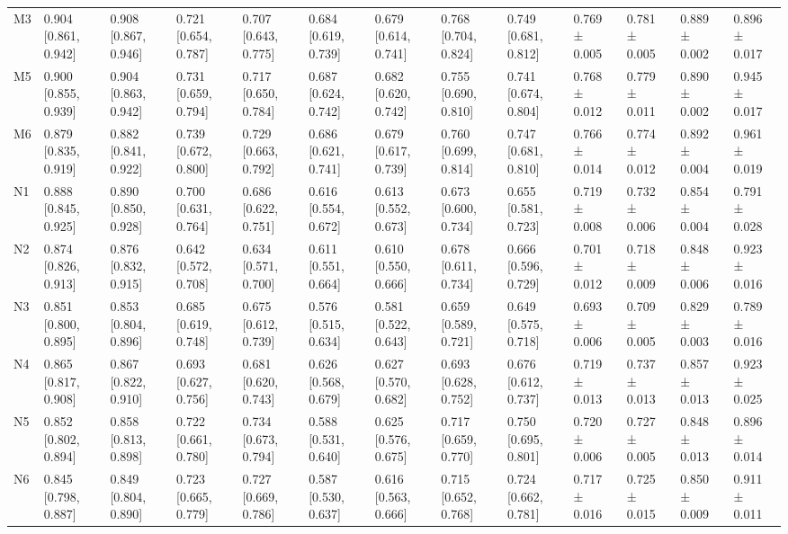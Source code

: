 \begin{table}
\begin{tabular}{lllllllllllll}
M3 & 0.904 [0.861, 0.942] & 0.908 [0.867, 0.946] & 0.721 [0.654, 0.787] & 0.707 [0.643, 0.775] & 0.684 [0.619, 0.739] & 0.679 [0.614, 0.741] & 0.768 [0.704, 0.824] & 0.749 [0.681, 0.812] & 0.769 ± 0.005 & 0.781 ± 0.005 & 0.889 ± 0.002 & 0.896 ± 0.017 \\
M5 & 0.900 [0.855, 0.939] & 0.904 [0.863, 0.942] & 0.731 [0.659, 0.794] & 0.717 [0.650, 0.784] & 0.687 [0.624, 0.742] & 0.682 [0.620, 0.742] & 0.755 [0.690, 0.810] & 0.741 [0.674, 0.804] & 0.768 ± 0.012 & 0.779 ± 0.011 & 0.890 ± 0.002 & 0.945 ± 0.017 \\
M6 & 0.879 [0.835, 0.919] & 0.882 [0.841, 0.922] & 0.739 [0.672, 0.800] & 0.729 [0.663, 0.792] & 0.686 [0.621, 0.741] & 0.679 [0.617, 0.739] & 0.760 [0.699, 0.814] & 0.747 [0.681, 0.810] & 0.766 ± 0.014 & 0.774 ± 0.012 & 0.892 ± 0.004 & 0.961 ± 0.019 \\
N1 & 0.888 [0.845, 0.925] & 0.890 [0.850, 0.928] & 0.700 [0.631, 0.764] & 0.686 [0.622, 0.751] & 0.616 [0.554, 0.672] & 0.613 [0.552, 0.673] & 0.673 [0.600, 0.734] & 0.655 [0.581, 0.723] & 0.719 ± 0.008 & 0.732 ± 0.006 & 0.854 ± 0.004 & 0.791 ± 0.028 \\
N2 & 0.874 [0.826, 0.913] & 0.876 [0.832, 0.915] & 0.642 [0.572, 0.708] & 0.634 [0.571, 0.700] & 0.611 [0.551, 0.664] & 0.610 [0.550, 0.666] & 0.678 [0.611, 0.734] & 0.666 [0.596, 0.729] & 0.701 ± 0.012 & 0.718 ± 0.009 & 0.848 ± 0.006 & 0.923 ± 0.016 \\
N3 & 0.851 [0.800, 0.895] & 0.853 [0.804, 0.896] & 0.685 [0.619, 0.748] & 0.675 [0.612, 0.739] & 0.576 [0.515, 0.634] & 0.581 [0.522, 0.643] & 0.659 [0.589, 0.721] & 0.649 [0.575, 0.718] & 0.693 ± 0.006 & 0.709 ± 0.005 & 0.829 ± 0.003 & 0.789 ± 0.016 \\
N4 & 0.865 [0.817, 0.908] & 0.867 [0.822, 0.910] & 0.693 [0.627, 0.756] & 0.681 [0.620, 0.743] & 0.626 [0.568, 0.679] & 0.627 [0.570, 0.682] & 0.693 [0.628, 0.752] & 0.676 [0.612, 0.737] & 0.719 ± 0.013 & 0.737 ± 0.013 & 0.857 ± 0.013 & 0.923 ± 0.025 \\
N5 & 0.852 [0.802, 0.894] & 0.858 [0.813, 0.898] & 0.722 [0.661, 0.780] & 0.734 [0.673, 0.794] & 0.588 [0.531, 0.640] & 0.625 [0.576, 0.675] & 0.717 [0.659, 0.770] & 0.750 [0.695, 0.801] & 0.720 ± 0.006 & 0.727 ± 0.005 & 0.848 ± 0.013 & 0.896 ± 0.014 \\
N6 & 0.845 [0.798, 0.887] & 0.849 [0.804, 0.890] & 0.723 [0.665, 0.779] & 0.727 [0.669, 0.786] & 0.587 [0.530, 0.637] & 0.616 [0.563, 0.666] & 0.715 [0.652, 0.768] & 0.724 [0.662, 0.781] & 0.717 ± 0.016 & 0.725 ± 0.015 & 0.850 ± 0.009 & 0.911 ± 0.011 \\

\end{tabular}
\end{table}
